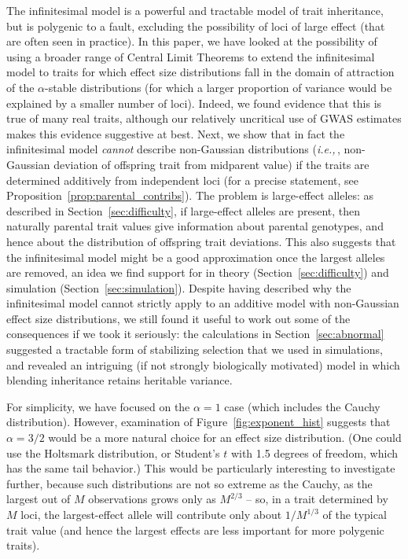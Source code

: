 \documentclass{article}
\newcommand{\ie}{\textit{i.e.,}\,}
\newcommand{\1}{\mathbbm{1}}
\theoremstyle{remark}
\theoremstyle{definition}
\begin{document}
The infinitesimal model is a powerful and tractable model of trait inheritance,
but is polygenic to a fault,
excluding the possibility of loci of large effect
(that are often seen in practice).
In this paper,
we have looked at the possibility of using a broader range of Central Limit Theorems
to extend the infinitesimal model to traits for which 
effect size distributions fall in the domain of attraction of the $\alpha$-stable distributions
(for which a larger proportion of variance
would be explained by a smaller number of loci).
Indeed, we found evidence that this is true of many real traits,
although our relatively uncritical use of GWAS estimates makes this evidence suggestive at best.
Next, we show that in fact the infinitesimal model \emph{cannot} describe non-Gaussian distributions
(\ie, non-Gaussian deviation of offspring trait from midparent value)
if the traits are determined additively from independent loci
(for a precise statement, see Proposition~\ref{prop:parental_contribs}).
The problem is large-effect alleles:
as described in Section~\ref{sec:difficulty},
if large-effect alleles are present, then naturally parental trait values give information about parental genotypes,
and hence about the distribution of offspring trait deviations.
This also suggests that the infinitesimal model might be a good approximation
once the largest alleles are removed,
an idea we find support for in theory (Section~\ref{sec:difficulty}) and simulation (Section~\ref{sec:simulation}).
Despite having described why
the infinitesimal model cannot strictly apply 
to an additive model with non-Gaussian effect size distributions,
we still found it useful to work out some of the consequences if we took it seriously:
the calculations in Section~\ref{sec:abnormal}
suggested a tractable form of stabilizing selection that we used in simulations,
and revealed an intriguing (if not strongly biologically motivated)
model in which blending inheritance retains heritable variance.

For simplicity, we have focused on the $\alpha=1$ case (which includes the Cauchy distribution).
However, examination of Figure~\ref{fig:exponent_hist} suggests that $\alpha=3/2$ 
would be a more natural choice for an effect size distribution.
(One could use the Holtsmark distribution,
or Student's $t$ with 1.5 degrees of freedom,
which has the same tail behavior.)
This would be particularly interesting to investigate further,
because such distributions are not so extreme as the Cauchy,
as the largest out of $M$ observations grows only as $M^{2/3}$ --
so, in a trait determined by $M$ loci,
the largest-effect allele will contribute only about $1/M^{1/3}$ of the typical trait value
(and hence the largest effects are less important for more polygenic traits).
\end{document}
